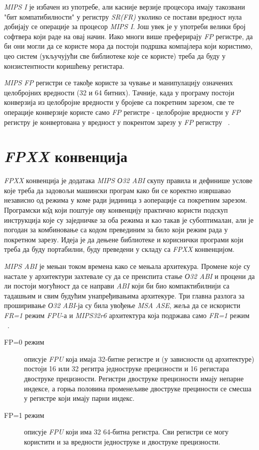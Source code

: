 \documentclass[12pt,oneside]{memoir}
\begin{document}
\indent \textit{MIPS I} је избачен из употребе, али касније верзије процесора имају такозвани "бит компатибилности" у регистру \textit{SR(FR)} уколико се постави вредност нула добијају се операције за процесор \textit{MIPS I}. Још увек је у употреби велики број софтвера који раде на овај начин. Иако многи више преферирају \textit{FP} регистре, да би они могли да се користе мора да постоји подршка компајлера који користимо, цео систем (укључујући све библиотеке које се користе) треба да буду у конзистентности коришћењу регистара.

\indent \textit{MIPS FP} регистри се такође користе за чување и манипулацију означених целобројних вредности (32 и 64 битних). Тачније, када у програму постоји конверзија из целобројне вредности у бројеве са покретним зарезом, све те операције конверзије користе само 
 \textit{FP} регистре - целобројне вредности у  \textit{FP} регистру је конвертована у вредност у покрентом зарезу у  \textit{FP} регистру ~\cite{SeeMIPSRun}.

\section{\textit{FPXX} конвенција}

\indent \textit{FPXX} конвенција је додатака \textit{MIPS О32 ABI} скупу правила и дефинише услове које треба да задовољи машински програм како би се коректно извршавао независно од режима у коме ради јидиница з аоперације са покретним зарезом. Програмски к\^{о}д који поштује ову конвенцију практично користи подскуп инструкција које су заједничке за оба режима и као такав је субоптималан, али је погодан за комбиновање са кодом превединим за било који режим рада у покретном зарезу. Идеја је да дењене библиотеке и кориснички програми који треба да буду портабилни, буду преведени у складу са \textit{FPXX} конвенцијом.

\indent \textit{MIPS ABI} је мењан током времена како се мењала архитекура. Промене које су настале у архитектури захтевале су да се преиспита стање \textit{О32 ABI} и процени да ли постоји могућност да се направи \textit{ABI} који би био компактибилнији са тадашњим и свим будућим унапређивањима архитекуре. Три главна разлога за проширивање \textit{О32 ABI}-ја су била увођење \textit{MSA ASE}, жеља да се искористи \textit{FR=1} режим \textit{FPU}-а и \textit{MIPS32r6} архитектура која подржава само \textit{FR=1} режим ~\cite{fpxxRef}.
\begin{description}
\item[FP=0 режим] описује \textit{FPU} која имаја 32-битне регистре и (у зависности од архитектуре) постоји 16 или 32 регитра једноструке прецизности и 16 регистара двоструке прецизности. Регистри двоструке прецизности имају непарне индексе, а горња половина променељиве двоструке прециности се смесша у регистре који имају парни индекс.
\item[FP=1 режим] описује \textit{FPU} који има 32 64-битна регистра. Сви регистри се могу користити и за вредности једноструке и двоструке прецизности.
\end{description}
\end{document}
